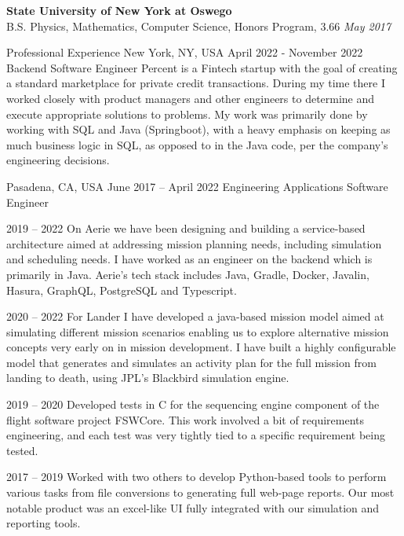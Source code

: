 \documentclass{resume} %
\begin{document}
\textbf{State University of New York at Oswego}
\\
B.S. Physics, Mathematics, Computer Science, Honors Program, 3.66
\hfill
\emph{May 2017}

\begin{rSection}{Professional Experience}{}
           {New York, NY, USA}
           {April 2022 - November 2022}
           {Backend Software Engineer}
           {
             Percent is a Fintech startup with the goal of creating a standard marketplace for private credit transactions. During my time there I worked closely with product managers and other engineers to determine and execute appropriate solutions to problems. My work was primarily done by working with SQL and Java (Springboot), with a heavy emphasis on keeping as much business logic in SQL, as opposed to in the Java code, per the company's engineering decisions.
           }

           {Pasadena, CA, USA}
           {June 2017 -- April 2022}
           {Engineering Applications Software Engineer}
           {
        {}
        {2019 -- 2022}
        {
          On Aerie we have been designing and building a service-based architecture aimed at addressing mission planning needs, including simulation and scheduling needs. I have worked as an engineer on the backend which is primarily in Java. Aerie's tech stack includes Java, Gradle, Docker, Javalin, Hasura, GraphQL, PostgreSQL and Typescript.
        }

        {}
        {2020 -- 2022}
        {
           For Lander I have developed a java-based mission model aimed at simulating different mission scenarios enabling us to explore alternative mission concepts very early on in mission development. I have built a highly configurable model that generates and simulates an activity plan for the full mission from landing to death, using JPL's Blackbird simulation engine.
        }

        {}
        {2019 -- 2020}
        {
          Developed tests in C for the sequencing engine component of the flight software project FSWCore. This work involved a bit of requirements engineering, and each test was very tightly tied to a specific requirement being tested.
        }

        {}
        {2017 -- 2019}
        {
          Worked with two others to develop Python-based tools to perform various tasks from file conversions to generating full web-page reports. Our most notable product was an excel-like UI fully integrated with our simulation and reporting tools.
        }

    }
\end{rSection}
\end{document}
